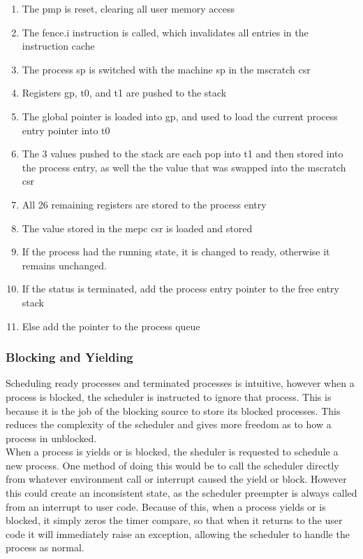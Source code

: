 \begin{enumerate}
    \item The \ac{pmp} is reset, clearing all user memory access
    \item The fence.i instruction is called, which invalidates all entries in the instruction cache
    \item The process sp is switched with the machine sp in the mscratch csr
    \item Registers gp, t0, and t1 are pushed to the stack
    \item The global pointer is loaded into gp, and used to load the current process entry pointer into t0
    \item The 3 values pushed to the stack are each pop into t1 and then stored into the process entry, as well the the value that was swapped into the mscratch csr
    \item All 26 remaining registers are stored to the process entry
    \item The value stored in the mepc csr is loaded and stored
    \item If the process had the running state, it is changed to ready, otherwise it remains unchanged.
    \item If the status is terminated, add the process entry pointer to the free entry stack
    \item Else add the pointer to the process queue
\end{enumerate}
\subsubsection{Blocking and Yielding}
Scheduling ready processes and terminated processes is intuitive, however when a process is blocked, the scheduler is instructed to ignore that process. This is because it is the job of the blocking source to store its blocked processes. This reduces the complexity of the scheduler and gives more freedom as to how a process in unblocked. \\
When a process is yields or is blocked, the sheduler is requested to schedule a new process. One method of doing this would be to call the scheduler directly from whatever environment call or interrupt caused the yield or block. However this could create an inconsistent state, as the scheduler preempter is always called from an interrupt to user code. Because of this, when a process yields or is blocked, it simply zeros the timer compare, so that when it returns to the user code it will immediately raise an exception, allowing the scheduler to handle the process as normal.

